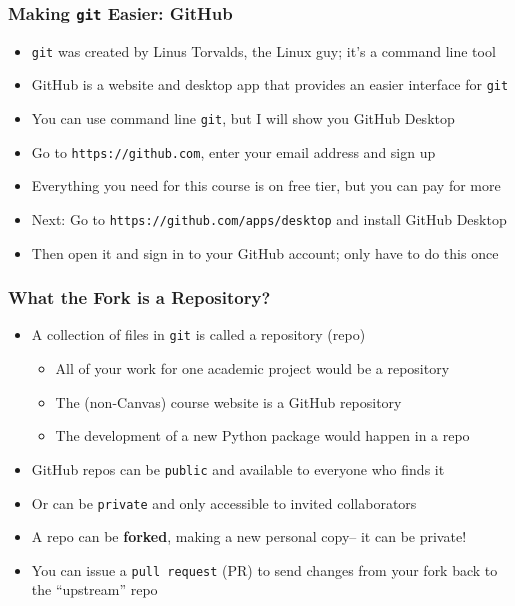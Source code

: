 \documentclass[aspectratio=169]{beamer}
\begin{document}

\begin{frame}
\frametitle{Making \texttt{git} Easier: GitHub}
\begin{itemize}
	\item \texttt{git} was created by Linus Torvalds, the Linux guy; it's a command line tool
	
	\item GitHub is a website and desktop app that provides an easier interface for \texttt{git}
	
	\item You can use command line \texttt{git}, but I will show you GitHub Desktop
	
	\item <2->Go to \texttt{https://github.com}, enter your email address and sign up
	
	\item <2->Everything you need for this course is on free tier, but you can pay for more
	
	\item <3->Next: Go to \texttt{https://github.com/apps/desktop} and install GitHub Desktop
	
	\item <3->Then open it and sign in to your GitHub account; only have to do this once
\end{itemize}
\end{frame}



\begin{frame}
\frametitle{What the Fork is a Repository?}
\begin{itemize}
	\item A collection of files in \texttt{git} is called a repository (repo)
	\begin{itemize}
		\item All of your work for one academic project would be a repository
	
		\item The (non-Canvas) course website is a GitHub repository
	
		\item The development of a new Python package would happen in a repo
	\end{itemize}
	
	\item <2->GitHub repos can be \texttt{public} and available to everyone who finds it
	
	\item <2->Or can be \texttt{private} and only accessible to invited collaborators
	
	\item <3->A repo can be \textbf{forked}, making a new personal copy-- it can be private!
	
	\item <3->You can issue a \texttt{pull request} (PR) to send changes from your fork back to the ``upstream'' repo
\end{itemize}
\end{frame}
\end{document}
